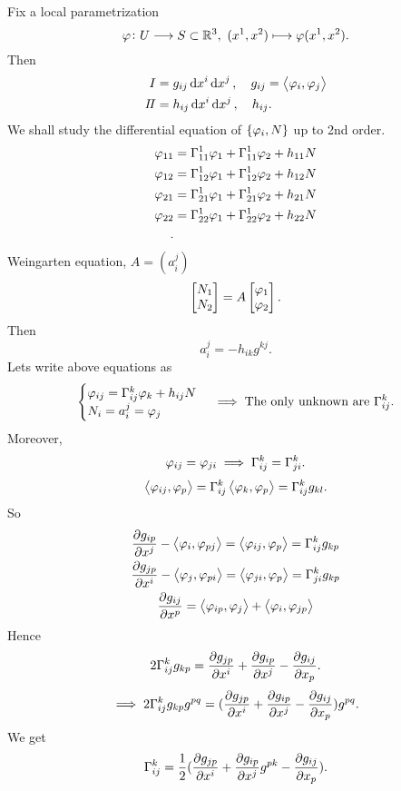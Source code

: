 Fix a local parametrization \[
    \varphi\colon U \longrightarrow S\subset \mathbb{R}^3,
    \ (x^1,x^2)\longmapsto \varphi(x^1,x^2)
.\] Then
\begin{align*}
    I&=g_{ij}\dd{x^i}\dd{x^j},\quad g_{ij}=\left<\varphi_i,\varphi_j\right> \\
    I\!I&=h_{ij}\dd{x^i}\dd{x^j},\quad h_{ij}
.\end{align*}
We shall study the differential equation of \(\{\varphi_i,N\}\) up to 2nd order.
\begin{align*}
    \varphi_{11}&=\Gamma_{11}^1\varphi_1+\Gamma_{11}^1\varphi_2+h_{11}N\\
    \varphi_{12}&=\Gamma_{12}^1\varphi_1+\Gamma_{12}^1\varphi_2+h_{12}N\\
    \varphi_{21}&=\Gamma_{21}^1\varphi_1+\Gamma_{21}^1\varphi_2+h_{21}N\\
    \varphi_{22}&=\Gamma_{22}^1\varphi_1+\Gamma_{22}^1\varphi_2+h_{22}N\\
.\end{align*}
Weingarten equation, \(A=(a_i^j)\)
\[
    \begin{bmatrix}
        N_1 \\ N_2
    \end{bmatrix}=A\begin{bmatrix}
        \varphi_1 \\ \varphi_2
    \end{bmatrix}
.\] Then \[
    a_i^j=-h_{ik}g^{kj}
.\] Lets write above equations as \[
    \begin{cases}
        \varphi_{ij}=\Gamma_{ij}^k\varphi_k+h_{ij}N \\
        N_i=a_i^j=\varphi_j
    \end{cases}
    \implies \text{The only unknown are }\Gamma_{ij}^k
.\] Moreover, \[
    \varphi_{ij}=\varphi_{ji}\implies \Gamma_{ij}^k=\Gamma_{ji}^k
.\] \[
    \left<\varphi_{ij},\varphi_p\right> =\Gamma_{ij}^k \left<\varphi_k,\varphi_p\right> 
    =\Gamma_{ij}^kg_{kl}
.\] So
\begin{gather*}
    \pdv{g_{ip}}{x^j}-\left<\varphi_i,\varphi_{pj}\right> 
    =\left<\varphi_{ij},\varphi_p\right> =\Gamma_{ij}^kg_{kp} \\
    \pdv{g_{jp}}{x^i}-\left<\varphi_j,\varphi_{pi}\right> 
    =\left<\varphi_{ji},\varphi_p\right> =\Gamma_{ji}^kg_{kp} \\
    \pdv{g_{ij}}{x^p}=\left<\varphi_{ip},\varphi_j\right>
    +\left<\varphi_i,\varphi_{jp}\right> 
\end{gather*}
Hence \[
    2\Gamma_{ij}^k g_{kp}=\pdv{g_{jp}}{x^i}+\pdv{g_{ip}}{x^j}-\pdv{g_{ij}}{x_{p}}
.\] \[
    \implies 2\Gamma_{ij}^kg_{kp}g^{pq}
    =(\pdv{g_{jp}}{x^i}+\pdv{g_{ip}}{x^j}-\pdv{g_{ij}}{x_{p}})g^{pq}
.\] We get \[
    \Gamma_{ij}^k=\frac{1}{2}(\pdv{g_{jp}}{x^i}+\pdv{g_{ip}}{x^j}g^{pk}
    -\pdv{g_{ij}}{x_{p}})
.\] 

